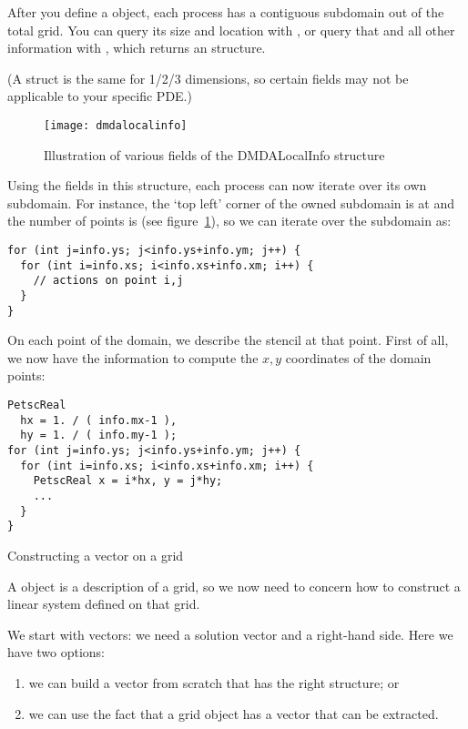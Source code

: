 After you define a  object, each process has a contiguous
subdomain out of the total grid.
You can query its size and location with ,
or query that and all other information with ,
which returns an  structure.

(A  struct is the same for 1/2/3 dimensions,
so certain fields may not be applicable to your specific \ac{PDE}.)

\begin{figure}[ht]
  \texttt{[image: dmdalocalinfo]}
  \caption{Illustration of various fields of the DMDALocalInfo structure}
  \label{fig:dmdalocalinfo}
\end{figure}

Using the fields in this structure, each process can now iterate over its
own subdomain.
For instance, the `top left' corner of the owned subdomain is at 
and the number of points is 
(see figure~\ref{fig:dmdalocalinfo}),
so we can iterate over the subdomain as:

\begin{lstlisting}
for (int j=info.ys; j<info.ys+info.ym; j++) {
  for (int i=info.xs; i<info.xs+info.xm; i++) {
    // actions on point i,j
  }
}
\end{lstlisting}

On each point of the domain, we describe the stencil at that point.
First of all, we now have the information to compute the $x,y$ coordinates
of the domain points:
\begin{lstlisting}
PetscReal
  hx = 1. / ( info.mx-1 ),
  hy = 1. / ( info.my-1 );
for (int j=info.ys; j<info.ys+info.ym; j++) {
  for (int i=info.xs; i<info.xs+info.xm; i++) {
    PetscReal x = i*hx, y = j*hy;
    ...
  }
}
\end{lstlisting}

 {Constructing a vector on a grid}

A  object is a description of a grid,
so we now need to concern how to construct a linear system
defined on that grid.

We start with vectors: we need a solution vector
and a right-hand side.
Here we have two options:
\begin{enumerate}
\item we can build a vector from scratch that has the right structure; or
\item we can use the fact that a grid object has a vector that can be extracted.
\end{enumerate}

